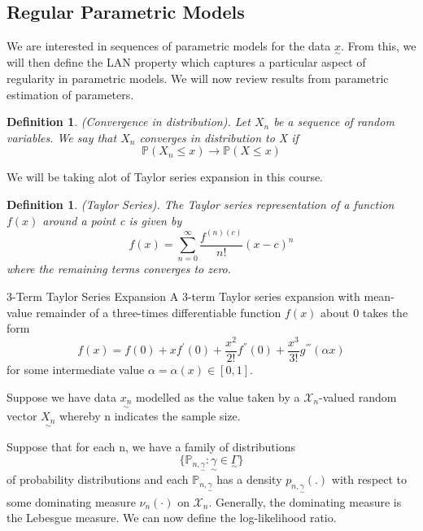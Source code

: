 \documentclass[twoside]{article}
\newtheorem{definition}[theorem]{Definition}
\newcommand{\prob}{\mathbb{P}}
\newcommand{\utilde}{\underset{\sim}}
\begin{document}
\subsection{Regular Parametric Models}

We are interested in sequences of parametric models for the data $\utilde{x}.$ From this, we will then define the LAN property which captures a particular aspect of regularity in parametric models. We will now review results from parametric estimation of parameters.

\begin{definition}(Convergence in distribution). Let $X_n$ be a sequence of random variables. We say that $X_n$ converges in distribution to X if 
$$
\prob(X_n \leq x) \rightarrow \prob(X \leq x)
$$
\end{definition}

We will be taking alot of Taylor series expansion in this course.

\begin{definition}(Taylor Series). The Taylor series representation of a function $f(x)$ around a point c is given by 
$$
f(x) = \sum_{n=0}^{\infty}\frac{f^{(n)(c)}}{n!}(x - c)^{n}
$$
where the remaining terms converges to zero.
\end{definition}

\begin{definition_exam}{3-Term Taylor Series Expansion}{} A 3-term Taylor series expansion with mean-value remainder of a three-times differentiable function $f(x)$ about 0 takes the form 
\begin{equation}
  f(x) = f(0) + xf^{'}(0) + \frac{x^2}{2!}f^{''}(0) + \frac{x^3}{3!}g^{'''}(\alpha x)
\end{equation}
for some intermediate value $\alpha = \alpha(x) \in [0,1].$
\end{definition_exam}


Suppose we have data $\utilde{x_n}$ modelled as the value taken by a $\mathcal{X}_{n}$-valued random vector $\utilde{X_n}$ whereby n indicates the sample size.

Suppose that for each n, we have a family of distributions 
$$
\{\prob_{n, \utilde{\gamma}}: \utilde{\gamma} \in \utilde{\Gamma}\}
$$
of probability distributions and each $\prob_{n, \utilde{\gamma}}$ has a density $p_{n, \utilde{\gamma}}(.)$ with respect to some dominating measure $\nu_n(\cdot)$ on $\mathcal{X}_n$. Generally, the dominating measure is the Lebesgue measure. We can now define the log-likelihood ratio.
\end{document}
